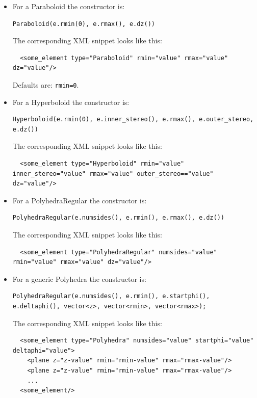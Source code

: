 \begin{itemize}
\item For a Paraboloid the constructor is:
\begin{verbatim}
Paraboloid(e.rmin(0), e.rmax(), e.dz())
\end{verbatim}
The corresponding XML snippet looks like this:
\begin{verbatim}
  <some_element type="Paraboloid" rmin="value" rmax="value" dz="value"/>
\end{verbatim}
Defaults are: \texttt{rmin=0}.

\item For a Hyperboloid the constructor is:
\begin{verbatim}
Hyperboloid(e.rmin(0), e.inner_stereo(), e.rmax(), e.outer_stereo, e.dz())
\end{verbatim}
The corresponding XML snippet looks like this:
\begin{verbatim}
  <some_element type="Hyperboloid" rmin="value" inner_stereo="value" rmax="value" outer_stereo=="value" dz="value"/>
\end{verbatim}

\item For a PolyhedraRegular the constructor is:
\begin{verbatim}
PolyhedraRegular(e.numsides(), e.rmin(), e.rmax(), e.dz())
\end{verbatim}
The corresponding XML snippet looks like this:
\begin{verbatim}
  <some_element type="PolyhedraRegular" numsides="value" rmin="value" rmax="value" dz="value"/>
\end{verbatim}

\item For a generic Polyhedra the constructor is:
\begin{verbatim}
PolyhedraRegular(e.numsides(), e.rmin(), e.startphi(), e.deltaphi(), vector<z>, vector<rmin>, vector<rmax>);
\end{verbatim}
The corresponding XML snippet looks like this:
\begin{verbatim}
  <some_element type="Polyhedra" numsides="value" startphi="value" deltaphi="value">
    <plane z="z-value" rmin="rmin-value" rmax="rmax-value"/>
    <plane z="z-value" rmin="rmin-value" rmax="rmax-value"/>
    ...
  <some_element/>
\end{verbatim}


\end{itemize}
